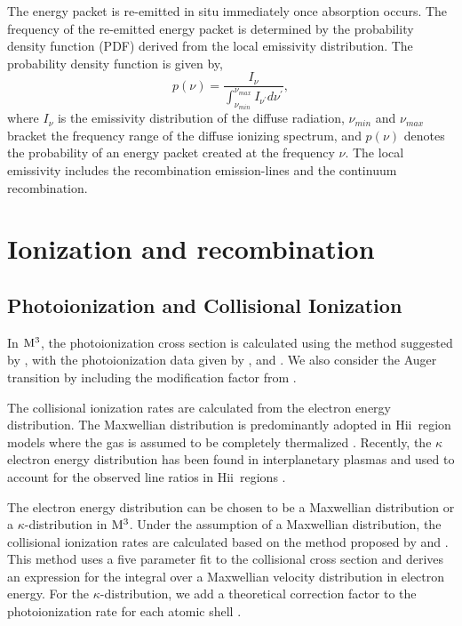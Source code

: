 \documentclass[twocolumn]{aastex62}
\newcommand{\newcode}{{$\rm M^3$}}
\newcommand{\hiireg}{{H{\sc ii}}}
\begin{document}
\begin{CJK*}{UTF8}{gbsn}
The energy packet is re-emitted in situ immediately once absorption occurs. 
The frequency of the re-emitted energy packet is determined by the probability density function (PDF) derived from the local emissivity distribution.
The probability density function is given by,
\begin{equation}\label{eq5}
 p (\nu)=\frac{I_\nu}{\int_{\nu_{min}}^{\nu_{max}}{I_{\nu^{\prime}}} d\nu^{\prime}},
\end{equation}
where $I_\nu$ is the emissivity distribution of the diffuse radiation, $\nu_{min}$ and $\nu_{max}$ bracket the frequency range of the diffuse ionizing spectrum, and $p (\nu)$ denotes the probability of an energy packet created at the frequency $\nu$. 
The local emissivity includes the recombination emission-lines and the continuum recombination.


\section{Ionization and recombination}\label{sec:ionrec}

\subsection{Photoionization and Collisional Ionization}

In \newcode , the photoionization cross section is calculated using the method suggested by \cite{Seaton-1958}, with the photoionization data given by \cite{Raymond-1979}, \cite{Osterbrock-1989} and \cite{Gould-1991}.
We also consider the Auger transition by including the modification factor from \cite{Weisheit-1974}.

The collisional ionization rates are calculated from the electron energy distribution.
The Maxwellian distribution is predominantly adopted in \hiireg\ region models where the gas is assumed to be completely thermalized \citep{Spitzer-1941, Draine-2018}.
Recently, the $\kappa$ electron energy distribution has been found in interplanetary plasmas \citep{Pierrard-2010} and used to account for the observed line ratios in \hiireg\ regions \citep{Binette-2012,Nicholls-2012,Nicholls-2013}.

The electron energy distribution can be chosen to be a Maxwellian distribution or a $\kappa$-distribution in \newcode .
Under the assumption of a Maxwellian distribution, the collisional ionization rates are calculated based on the method proposed by \cite{Arnaud-1985} and \cite{Younger-1981}.  
This method uses a five parameter fit to the collisional cross section and derives an expression for the integral over a Maxwellian velocity distribution in electron energy.
For the $\kappa$-distribution, we add a theoretical correction factor to the photoionization rate for each atomic shell \citep{Nicholls-2012,Nicholls-2013}.



\end{CJK*}
\end{document}
